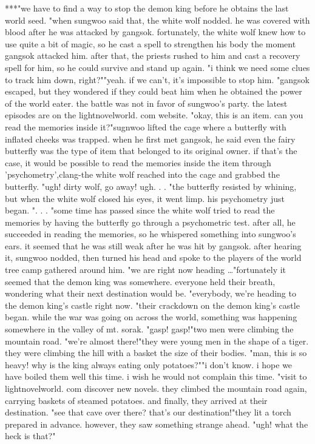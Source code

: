 ***"we have to find a way to stop the demon king before he obtains the last world seed.
"when sungwoo said that, the white wolf nodded.
 he was covered with blood after he was attacked by gangsok.
 fortunately, the white wolf knew how to use quite a bit of magic, so he cast a spell to strengthen his body the moment gangsok attacked him.
 after that, the priests rushed to him and cast a recovery spell for him, so he could survive and stand up again.
"i think we need some clues to track him down, right?""yeah.
 if we can't, it's impossible to stop him.
"gangsok escaped, but they wondered if they could beat him when he obtained the power of the world eater.
 the battle was not in favor of sungwoo's party.
the latest episodes are on the lightnovelworld.
com website.
"okay, this is an item.
 can you read the memories inside it?"sugnwoo lifted the cage where a butterfly with inflated cheeks was trapped.
when he first met gangsok, he said even the fairy butterfly was the type of item that belonged to its original owner.
 if that's the case, it would be possible to read the memories inside the item through 'psychometry',clang-the white wolf reached into the cage and grabbed the butterfly.
"ugh! dirty wolf, go away! ugh.
.
.
"the butterfly resisted by whining, but when the white wolf closed his eyes, it went limp.
 his psychometry just began.
".
.
.
"some time has passed since the white wolf tried to read the memories by having the butterfly go through a psychometric test.
 after all, he succeeded in reading the memories, so he whispered something into sungwoo's ears.
it seemed that he was still weak after he was hit by gangsok.
after hearing it, sungwoo nodded, then turned his head and spoke to the players of the world tree camp gathered around him.
"we are right now heading …"fortunately it seemed that the demon king was somewhere.
everyone held their breath, wondering what their next destination would be.
"everybody, we're heading to the demon king's castle right now.
"their crackdown on the demon king's castle began.
 while the war was going on across the world, something was happening somewhere in the valley of mt.
 sorak.
 "gasp! gasp!"two men were climbing the mountain road.
"we're almost there!"they were young men in the shape of a tiger.
 they were climbing the hill with a basket the size of their bodies.
 "man, this is so heavy! why is the king always eating only potatoes?""i don't know.
 i hope we have boiled them well this time.
 i wish he would not complain this time.
"visit to lightnov‌elworld.
com discover new novels.
they climbed the mountain road again, carrying baskets of steamed potatoes.
 and finally, they arrived at their destination.
"see that cave over there? that's our destination!"they lit a torch prepared in advance.
 however, they saw something strange ahead.
 "ugh! what the heck is that?"

